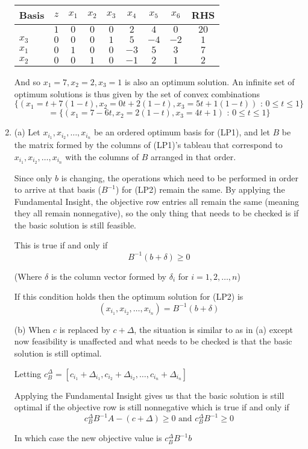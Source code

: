 \documentclass{article}[12pt,a4paper]
\begin{document}
\begin{enumerate}
		\begin{center}
 		\begin{tabular}{l | c | c c c c c c | c}
             		Basis & $z$ & $x_1$ & $x_2$ & $x_3$ & $x_4$ & $x_5$ & $x_6$ & RHS \\ \hline
  			     & $1$ & $0$ & $0$   & $0$ & $2$  & $4$     & $0$     & $20$  \\ \hline
  			$x_3$ & $0$ & $0$ & $0$   & $1$    & $5$      & $-4$     & $-2$     & $1$ \\
  			$x_1$ & $0$ & $1$ & $0$  & $0$    & $-3$      & $5$     & $3$     & $7$ \\
  			$x_2$ & $0$ & $0$ & $1$ & $0$    & $-1$      & $2$     & $1$     & $2$ \\
  		\end{tabular}
  		\end{center}
	
	And so $x_1 = 7, x_2 = 2, x_3 = 1$ is also an optimum solution. An infinite set of optimum
	solutions is thus given by the set of convex combinations
	$$\{(x_1 = t + 7(1-t), x_2 = 0t + 2(1-t), x_3 = 5t + 1(1-t)) \mbox{ : } 0 \le t \le 1\}$$
	$$= \{(x_1 = 7 - 6t, x_2 = 2(1 - t), x_3 = 4t + 1) \mbox{ : } 0 \le t \le 1\}$$
	\pagebreak
	
	\item 
	(a) Let $x_{i_1}, x_{i_2}, \dots, x_{i_n}$ be an ordered optimum basis for (LP1), and let $B$ be the
	matrix formed by the columns of (LP1)'s tableau that correspond to $x_{i_1}, x_{i_2}, \dots, x_{i_n}$ 
	with the columns of $B$ arranged in that order.
	
	Since only $b$ is changing, the operations which need to be performed in order to arrive at that basis ($B^{-1}$)
	for (LP2) remain the same. By applying the Fundamental Insight, the objective row entries all remain the same
	(meaning they all remain nonnegative), so the only thing that needs to be checked is if the basic solution is still feasible.
	
	This is true if and only if
	$$B^{-1}(b + \delta) \ge 0$$
	
	(Where $\delta$ is the column vector formed by $\delta_i$ for $i = 1, 2, \dots, n$)
	
	If this condition holds then the optimum solution for (LP2) is
	$$(x_{i_1}, x_{i_2}, \dots, x_{i_n}) = B^{-1}(b + \delta)$$ \newline
	
	(b) When $c$ is replaced by $c + \Delta$, the situation is similar to as in (a) except now
	feasibility is unaffected and what needs to be checked is that the basic solution is still optimal.
	
	Letting $c^\Delta_B = [c_{i_1} + \Delta_{i_1}, c_{i_2} + \Delta_{i_2}, \dots, c_{i_n} + \Delta_{i_n}]$
	
	Applying the Fundamental Insight gives us that the basic solution is still optimal if the objective row is
	still nonnegative which is true if and only if
	$$c^\Delta_BB^{-1}A - (c + \Delta) \ge 0 \mbox{ and } c^\Delta_BB^{-1} \ge 0$$
	
	In which case the new objective value is $c^\Delta_BB^{-1}b$
  \end{enumerate}
\end{document}
